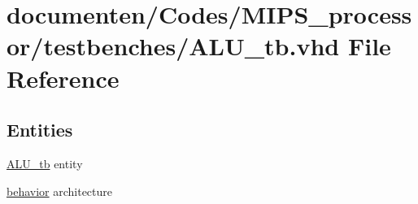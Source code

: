 \hypertarget{_a_l_u__tb_8vhd}{\section{documenten/\-Codes/\-M\-I\-P\-S\-\_\-processor/testbenches/\-A\-L\-U\-\_\-tb.vhd File Reference}
\label{_a_l_u__tb_8vhd}
}
\subsection*{Entities}
\begin{DoxyCompactItemize}
\item 
\hyperlink{class_a_l_u__tb}{A\-L\-U\-\_\-tb} entity
\item 
\hyperlink{class_a_l_u__tb_1_1behavior}{behavior} architecture
\end{DoxyCompactItemize}
